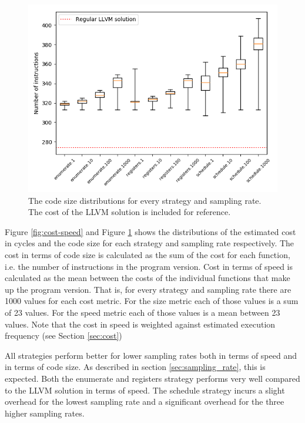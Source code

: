 \begin{figure}[ht]
	\centering
	\includegraphics[width=\textwidth,height=0.5\textheight]{results/figures/cost_size}
	\caption{The code size distributions for every strategy and sampling rate. The cost of the LLVM solution is included for reference.}
	\label{fig:cost-size}
\end{figure}

Figure \ref{fig:cost-speed} and Figure \ref{fig:cost-size} shows the distributions of the
estimated cost in cycles and the code size for each strategy and sampling rate
respectively. The cost in terms of code size is calculated as the sum of the cost for each
function, i.e. the number of instructions in the program version. Cost in terms of speed
is calculated as the mean between the costs of the individual functions that make
up the program version. That is, for every strategy and sampling rate there are 1000
values for each cost metric. For the size metric each of those values is a sum of 23
values. For the speed metric each of those values is a mean between 23 values. Note that
the cost in speed is weighted against estimated execution frequency (see Section \ref{sec:cost})

All strategies perform better for lower sampling rates both in terms of speed and in terms
of code size. As described in section \ref{sec:sampling_rate}, this is expected. Both the
enumerate and registers strategy performs very well compared to the LLVM solution
in terms of speed. The schedule strategy incurs a slight overhead for the lowest sampling
rate and a significant overhead for the three higher sampling rates.

